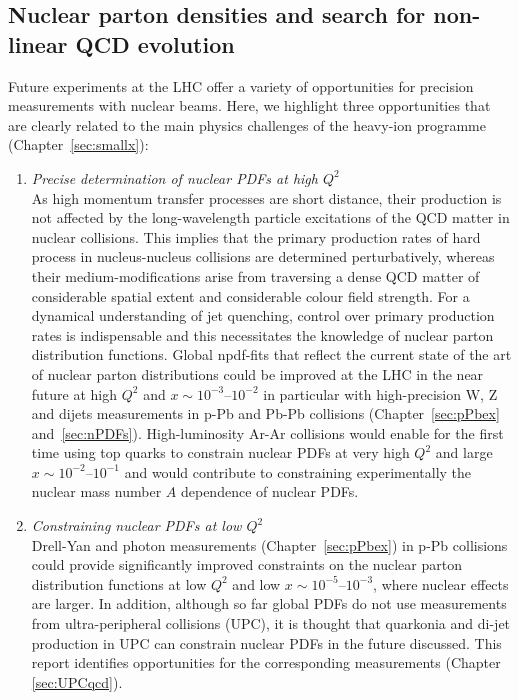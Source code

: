 \documentclass[../report.tex]{subfiles}
\begin{document}
\subsection{Nuclear parton densities and search for non-linear QCD evolution}
Future experiments at the LHC offer a variety of opportunities for precision measurements with nuclear beams. Here, we highlight three opportunities that are clearly related to the main physics challenges of the heavy-ion programme (Chapter~\ref{sec:smallx}):

\begin{enumerate}
\item {\it Precise determination of nuclear PDFs at high $Q^2$}\\ As high momentum transfer processes are short distance, their production is not affected by the long-wavelength particle excitations of the QCD matter in nuclear collisions. This implies that the primary production rates of hard process in nucleus-nucleus collisions are determined perturbatively, whereas their medium-modifications arise from traversing a dense QCD matter of considerable spatial extent and considerable colour field strength. For  a dynamical understanding of jet quenching, control over primary production rates is indispensable and this necessitates the knowledge of nuclear parton distribution functions. Global npdf-fits that reflect the current state of the art of nuclear parton distributions could be improved at the LHC in the near future at high $Q^2$ and $x\sim 10^{-3}$--$10^{-2}$ in particular with high-precision W, Z and dijets measurements in p-Pb and Pb-Pb collisions (Chapter~\ref{sec:pPbex} and~\ref{sec:nPDFs}). High-luminosity Ar-Ar collisions would enable for the first time using top quarks to constrain nuclear PDFs at very high $Q^2$ and large $x\sim 10^{-2}$--$10^{-1}$ and would contribute to constraining experimentally the nuclear mass number $A$ dependence of nuclear PDFs. 
\item {\it Constraining nuclear PDFs at low $Q^2$}\\ Drell-Yan and photon measurements (Chapter~\ref{sec:pPbex}) in p-Pb collisions could provide significantly improved constraints on the nuclear parton distribution functions at low $Q^2$ and low $x\sim 10^{-5}$--$10^{-3}$, where nuclear effects are larger. In addition, although so far global PDFs do not use measurements from ultra-peripheral collisions (UPC), it is thought that quarkonia and di-jet production in UPC can constrain nuclear PDFs in the future discussed. This report identifies opportunities for the corresponding measurements (Chapter \ref{sec:UPCqcd}). 

\end{enumerate}
\end{document}
